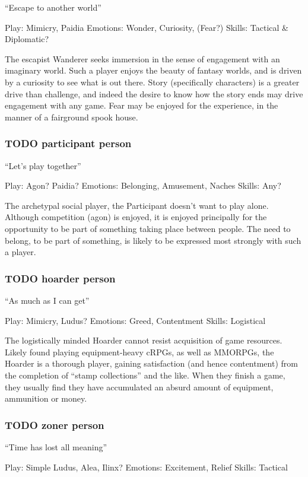 \documentclass[11pt]{article}
\begin{document}
“Escape to another world”

Play: Mimicry, Paidia
Emotions: Wonder, Curiosity, (Fear?)
Skills: Tactical \& Diplomatic?

The escapist Wanderer seeks immersion in the sense of engagement with
an imaginary world. Such a player enjoys the beauty of fantasy
worlds, and is driven by a curiosity to see what is out there. Story
(specifically characters) is a greater drive than challenge, and
indeed the desire to know how the story ends may drive engagement
with any game. Fear may be enjoyed for the experience, in the manner
of a fairground spook house.
\subsubsection{{\bfseries\sffamily TODO} participant person}
\label{sec-2-2-15}


“Let’s play together”

Play: Agon? Paidia?
Emotions: Belonging, Amusement, Naches
Skills: Any?

The archetypal social player, the Participant doesn’t want to
play alone. Although competition (agon) is enjoyed, it is enjoyed
principally for the opportunity to be part of something taking place
between people. The need to belong, to be part of something, is
likely to be expressed most strongly with such a player.
\subsubsection{{\bfseries\sffamily TODO} hoarder person}
\label{sec-2-2-16}


“As much as I can get”

Play: Mimicry, Ludus?
Emotions: Greed, Contentment
Skills: Logistical

The logistically minded Hoarder cannot resist acquisition of
game resources. Likely found playing equipment-heavy cRPGs, as well
as MMORPGs, the Hoarder is a thorough player, gaining satisfaction
(and hence contentment) from the completion of “stamp collections”
and the like. When they finish a game, they usually find they have
accumulated an absurd amount of equipment, ammunition or money.
\subsubsection{{\bfseries\sffamily TODO} zoner person}
\label{sec-2-2-17}


“Time has lost all meaning”

Play: Simple Ludus, Alea, Ilinx?
Emotions: Excitement, Relief
Skills: Tactical 
\end{document}
